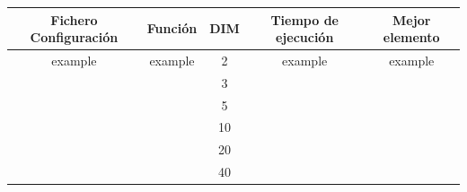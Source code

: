 \begin{tabular}{||c|c|c|c|c||}
    \hline
    \textbf{Fichero Configuración} & \textbf{Función} & \textbf{DIM} & \textbf{Tiempo de ejecución} & \textbf{Mejor elemento} \\ \hline
    example                                     & example          & 2      & example                      & example                 \\ \hline
                                                &                  & 3             &                              &                         \\ \hline
                                                &                  & 5             &                              &                         \\ \hline
                                                &                  & 10             &                              &                         \\ \hline
                                                &                  & 20             &                              &                         \\ \hline
                                                &                  & 40             &                              &                         \\ \hline

\end{tabular}

